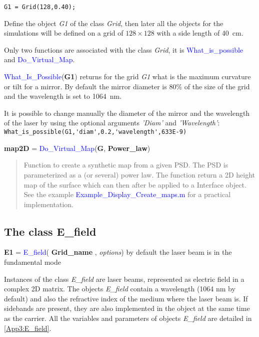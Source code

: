 \begin{verbatim}
G1 = Grid(128,0.40);
\end{verbatim}

Define the object \textsl{G1} of the class \textsl{Grid}, then later all the objects for the simulations will be defined on a grid of $128 \times 128$ with a side length of 40~cm.

Only two functions are associated with the class \textsl{Grid}, it is \textcolor{blue}{What\_is\_possible} and \textcolor{blue}{Do\_Virtual\_Map}.

 \textcolor{blue}{What\_Is\_Possible}(\textbf{G1}) returns for the grid \textsl{G1} what is the maximum curvature or tilt for a mirror. By default the mirror diameter is 80\% of the size of the grid and the wavelength is set to 1064~nm.

It is possible to change manually the diameter of the mirror and the wavelength of the laser by using the optional arguments \emph{'Diam'} and \emph{'Wavelength'}: \verb? What_is_possible(G1,'diam',0.2,'wavelength',633E-9) ?

\noindent \textbf{map2D} = \textcolor{blue}{Do\_Virtual\_Map}(\textbf{G}, \textbf{Power\_law})
\vspace*{-0.2cm}
\begin{quote}
Function to create a synthetic map from a given PSD. The PSD is parameterized as a (or several) power law. The function return a 2D height map of the surface which can then after be applied to a Interface object. See the example \textcolor{blue}{Example\_Display\_Create\_maps.m} for a practical implementation.
\end{quote}


\subsection{The class E\_field}
\textbf{E1} = \textcolor{blue}{E\_field}( \textbf{Grid\_name} , \emph{options}) by default the laser beam is in the fundamental mode

Instances of the class \textsl{E\_field} are laser beams, represented as electric field in a complex 2D matrix. The objects \textsl{E\_field} contain a wavelength (1064 nm by default) and also the refractive index of the medium where the laser beam is. If sidebands are present, they are also implemented in the object at the same time as the carrier. All the variables and parameters of objects \textsl{E\_field} are detailed in \ref{App3:E_field}.

